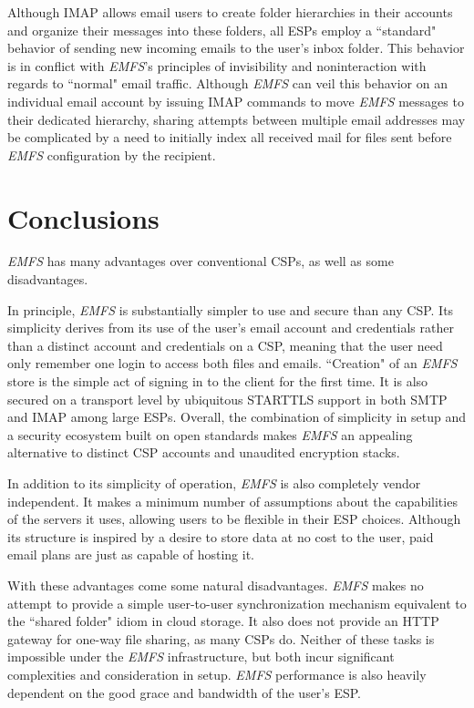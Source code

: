\documentclass[12pt]{article}
\begin{document}
Although IMAP allows email users to create folder hierarchies in their accounts
and organize their messages into these folders, all ESPs employ a ``standard"
behavior of sending new incoming emails to the user's inbox folder. This
behavior is in conflict with \textit{EMFS}'s principles of invisibility and
noninteraction with regards to ``normal" email traffic. Although \textit{EMFS}
can veil this behavior on an individual email account by issuing IMAP commands
to move \textit{EMFS} messages to their dedicated hierarchy, sharing attempts
between multiple email addresses may be complicated by a need to initially
index all received mail for files sent before \textit{EMFS} configuration
by the recipient.

\section{Conclusions}

\textit{EMFS} has many advantages over conventional CSPs, as well as some
disadvantages.

In principle, \textit{EMFS} is substantially simpler to use and secure than
any CSP. Its simplicity derives from its use of the user's email account and
credentials rather than a distinct account and credentials on a CSP, meaning
that the user need only remember one login to access both files and emails.
``Creation" of an \textit{EMFS} store is the simple act of signing in to the
client for the first time. It is also secured on a transport level by ubiquitous
STARTTLS support in both SMTP and IMAP among large ESPs. Overall, the
combination of simplicity in setup and a security ecosystem built on open
standards makes \textit{EMFS} an appealing alternative to distinct CSP accounts
and unaudited encryption stacks.

In addition to its simplicity of operation, \textit{EMFS} is also completely
vendor independent. It makes a minimum number of assumptions about the
capabilities of the servers it uses, allowing users to be flexible in their
ESP choices. Although its structure is inspired by a desire to store
data at no cost to the user, paid email plans are just as capable of hosting it.

With these advantages come some natural disadvantages. \textit{EMFS} makes
no attempt to provide a simple user-to-user synchronization mechanism equivalent
to the ``shared folder" idiom in cloud storage. It also does not provide an
HTTP gateway for one-way file sharing, as many CSPs do. Neither of these tasks
is impossible under the \textit{EMFS} infrastructure, but both incur significant
complexities and consideration in setup. \textit{EMFS} performance is also
heavily dependent on the good grace and bandwidth of the user's ESP.
\end{document}
